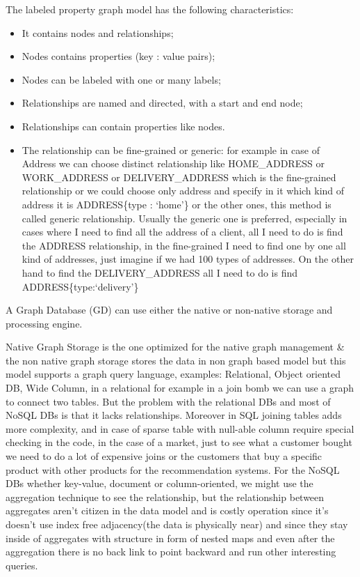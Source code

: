 \documentclass[a4page, 11pt]{article}
\begin{document}
The labeled property graph model has the following characteristics:

\begin{itemize}[noitemsep]
	 
	\item
	It contains nodes and relationships;
	\item
	Nodes contains properties (key : value pairs);
	\item
	Nodes can be labeled with one or many labels;
	\item
	Relationships are named and directed, with a start and end node;
	\item
	Relationships can contain properties like nodes.
	\item
	The relationship can be fine-grained or generic: for example in case of Address we can choose distinct relationship like HOME\_ADDRESS or WORK\_ADDRESS or DELIVERY\_ADDRESS which is the fine-grained relationship or we could choose only address and specify in it which kind of address it is ADDRESS\{type : `home'\} or the other ones, this method is called generic relationship. Usually the generic one is preferred,  especially in cases where I need to find all the address of a client, all I need to do is find the ADDRESS relationship, in the fine-grained I need to find one by one all kind of addresses, just	imagine if we had 100 types of addresses. On the other hand to find the DELIVERY\_ADDRESS all I need to do is find ADDRESS\{type:`delivery'\} 
\end{itemize}

A Graph Database (GD) can use either the native or non-native storage and processing engine.

Native Graph Storage is the one optimized for the native graph management \& the non native graph storage stores the data in non graph based model but this model supports a graph query language, examples: Relational, Object oriented DB, Wide Column, in a relational for example in a join bomb we can use a graph to connect two tables. But the problem
with the relational DBs and most of NoSQL DBs is that it lacks relationships.
Moreover in SQL joining tables adds more complexity, and in case of sparse table with null-able column require special checking in the code, in the case of a market, just to see what a customer bought we need to do a lot of expensive joins or the customers that buy a specific product with other products for the recommendation systems. 
For the NoSQL DBs whether key-value, document or column-oriented, we might use the aggregation technique to see the relationship, but the relationship between aggregates aren't citizen in the data model and is costly operation since it's doesn't use index free adjacency(the data is physically near) and since they stay inside of aggregates with structure in form of nested maps and even after the aggregation there is no back link to point backward and run
other interesting queries.
\end{document}
